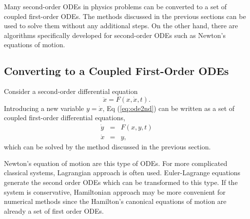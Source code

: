 Many second-order ODEs in physics problems can be converted to a set of coupled first-order ODEs.  The methods discussed in the previous sections can be used to solve them without any additional steps.  On the other hand, there are algorithms specifically developed for second-order ODEs such as Newton's equations of motion.  

\subsection{Converting to a Coupled First-Order ODEs}
Consider a second-order differential equation
\begin{equation}
\ddot{x} = F(x,\dot{x},t).
\label{eq:ode2nd}
\end{equation}
Introducing a new variable $y = \dot{x}$, Eq (\ref{eq:ode2nd}) can be written as
a set of coupled first-order differential equations,
\begin{eqnarray}
\dot{y} & = & F(x,y,t) \\
\dot{x} & = & y ,
\end{eqnarray}
which can be solved by the method discussed in the previous section.


Newton's equation of motion are this type of ODEs.  For more complicated classical systems, Lagrangian approach is often used. Euler-Lagrange equations generate the second order ODEs which can be transformed to this type. If the system is conservative, Hamiltonian approach may be more convenient for numerical methods since the Hamilton's canonical equations of motion are already a set of first order ODEs.


\bigskip

